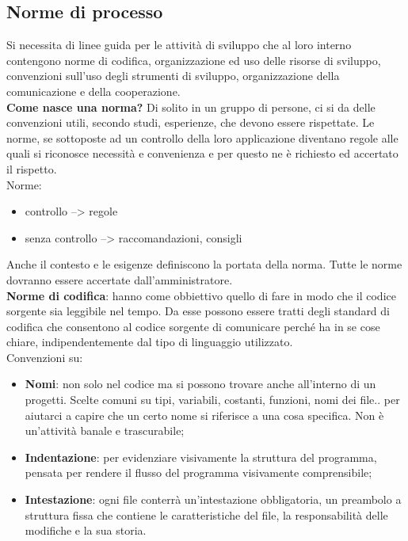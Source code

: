 \subsection{Norme di processo}
Si necessita di linee guida per le attività di sviluppo che al loro interno contengono norme di codifica, organizzazione ed uso delle risorse di sviluppo, convenzioni sull'uso degli strumenti di sviluppo, organizzazione della comunicazione e della cooperazione.\\
\textbf{Come nasce una norma?} Di solito in un gruppo di persone, ci si da delle convenzioni utili, secondo studi, esperienze, che devono essere rispettate.
Le norme, se sottoposte ad un controllo della loro applicazione diventano regole alle quali si riconosce necessità e convenienza e per questo ne è richiesto ed accertato il rispetto.\\
Norme:
\begin{itemize}
\item controllo --> regole
\item senza controllo --> raccomandazioni, consigli
\end{itemize}
Anche il contesto e le esigenze definiscono la portata della norma. Tutte le norme dovranno essere accertate dall'amministratore.\\
\textbf{Norme di codifica}: hanno come obbiettivo quello di fare in modo che il codice sorgente sia leggibile nel tempo. Da esse possono essere tratti degli standard di codifica che consentono al codice sorgente di comunicare perché ha in se cose chiare, indipendentemente dal tipo di linguaggio utilizzato.\\
Convenzioni su:
\begin{itemize}
\item \textbf{Nomi}: non solo nel codice ma si possono trovare anche all'interno di un progetti. Scelte comuni su tipi, variabili, costanti, funzioni, nomi dei file.. per aiutarci a capire che un certo nome si riferisce a una cosa specifica. Non è un'attività banale e trascurabile;
\item \textbf{Indentazione}: per evidenziare visivamente la struttura del programma, pensata per rendere il flusso del programma visivamente comprensibile;
\item \textbf{Intestazione}: ogni file conterrà un'intestazione obbligatoria, un preambolo a struttura fissa che contiene le caratteristiche del file, la responsabilità delle modifiche e la sua storia.
\end{itemize}


